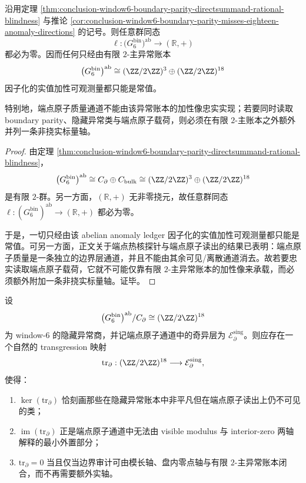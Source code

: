 \begin{theorem}\label{thm:conclusion-window6-endpoint-atom-not-additive-through-2primary-ledger}
沿用定理 \ref{thm:conclusion-window6-boundary-parity-directsummand-rational-blindness} 与推论 \ref{cor:conclusion-window6-boundary-parity-misses-eighteen-anomaly-directions} 的记号。则任意群同态
\[
\ell:\bigl(G_6^{\mathrm{bin}}\bigr)^{\mathrm{ab}}\longrightarrow (\mathbb R,+)
\]
都必为零。因而任何只经由有限 \(2\)-主异常账本
\[
\bigl(G_6^{\mathrm{bin}}\bigr)^{\mathrm{ab}}
\cong
(\ZZ/2\ZZ)^3\oplus(\ZZ/2\ZZ)^{18}
\]
因子化的实值加性可观测量都只能是常值。

特别地，端点原子质量通道不能由该异常账本的加性像忠实实现；若要同时读取 boundary parity、隐藏异常类与端点原子载荷，则必须在有限 \(2\)-主账本之外额外并列一条非挠实标量轴。
\end{theorem}
\begin{proof}
由定理 \ref{thm:conclusion-window6-boundary-parity-directsummand-rational-blindness}，
\[
\bigl(G_6^{\mathrm{bin}}\bigr)^{\mathrm{ab}}
\cong
C_{\partial}\oplus C_{\mathrm{bulk}}
\cong
(\ZZ/2\ZZ)^3\oplus(\ZZ/2\ZZ)^{18}
\]
是有限 \(2\)-群。另一方面，\((\mathbb R,+)\) 无非零挠元，故任意群同态
\(
\ell:(G_6^{\mathrm{bin}})^{\mathrm{ab}}\to (\mathbb R,+)
\)
都必为零。

于是，一切只经由该 abelian anomaly ledger 因子化的实值加性可观测量都只能是常值。可另一方面，正文关于端点热核探针与端点原子读出的结果已表明：端点原子质量是一条独立的边界层通道，并且不能由其余可见/离散通道消去。故若要忠实读取端点原子载荷，它就不可能仅靠有限 \(2\)-主异常账本的加性像来承载，而必须额外附加一条非挠实标量轴。证毕。
\end{proof}

\begin{conjecture}\label{conj:conclusion-window6-hidden-anomaly-to-endpoint-transgression}
设
\[
\bigl(G_6^{\mathrm{bin}}\bigr)^{\mathrm{ab}}/C_{\partial}
\cong
(\ZZ/2\ZZ)^{18}
\]
为 window-\(6\) 的隐藏异常商，并记端点原子通道中的奇异层为 \(\mathcal E_{\partial}^{\mathrm{sing}}\)。则应存在一个自然的 transgression 映射
\[
\mathrm{tr}_{\partial}:
(\ZZ/2\ZZ)^{18}\longrightarrow \mathcal E_{\partial}^{\mathrm{sing}},
\]
使得：
\begin{enumerate}
  \item \(\ker(\mathrm{tr}_{\partial})\) 恰刻画那些在隐藏异常账本中非平凡但在端点原子读出上仍不可见的类；
  \item \(\operatorname{im}(\mathrm{tr}_{\partial})\) 正是端点原子通道中无法由 visible modulus 与 interior-zero 两轴解释的最小外置部分；
  \item \(\mathrm{tr}_{\partial}=0\) 当且仅当边界审计可由模长轴、盘内零点轴与有限 \(2\)-主异常账本闭合，而不再需要额外实轴。
\end{enumerate}
\end{conjecture}
